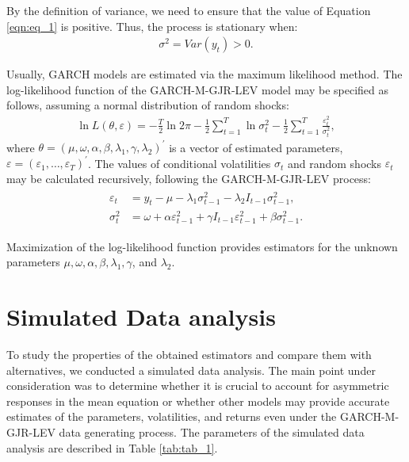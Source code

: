 \documentclass[authoryear, 1p]{elsarticle}
\numberwithin{equation}{section}
\begin{document}
By the definition of variance, we need to ensure that the value of Equation \ref{eqn:eq_1} is positive. Thus, the process is stationary when:
\begin{align}
\sigma^2 = Var(y_{t}) > 0.
\end{align}

Usually, GARCH models are estimated via the maximum likelihood method. The log-likelihood function of the GARCH-M-GJR-LEV model may be specified as follows, assuming a normal distribution of random shocks:
\begin{align}
\ln{L}(\theta, \varepsilon) = -\frac{T}{2} \ln{2\pi} - \frac{1}{2} \sum_{t = 1}^{T} \ln{\sigma^2_{t}} - \frac{1}{2} \sum_{t = 1}^{T} \frac{\varepsilon^2_{t}}{\sigma^2_{t}},
\end{align}
where $\theta = (\mu, \omega, \alpha, \beta, \lambda_{1}, \gamma, \lambda_{2})^{'}$ is a vector of estimated parameters, $\varepsilon = (\varepsilon_{1}, \dots, \varepsilon_{T})^{'}$. The values of conditional volatilities $\sigma_{t}$ and random shocks $\varepsilon_{t}$ may be calculated recursively, following the GARCH-M-GJR-LEV process:
\begin{align}
\begin{split}
\varepsilon_{t} &= y_{t} - \mu - \lambda_{1}\sigma^2_{t-1} - \lambda_{2}I_{t-1}\sigma^2_{t-1}, \\ 
\sigma^2_{t} &= \omega + \alpha \varepsilon^2_{t-1} + \gamma I_{t-1} \varepsilon^2_{t-1} + \beta \sigma^2_{t-1}.
\end{split}
\end{align}

Maximization of the log-likelihood function provides estimators for the unknown parameters $\mu, \omega, \alpha, \beta, \lambda_{1}, \gamma$, and $\lambda_{2}$.

\section{Simulated Data analysis }\label{Section5}


To study the properties of the obtained estimators and compare them with alternatives, we conducted a simulated data analysis. The main point under consideration was to determine whether it is crucial to account for asymmetric responses in the mean equation or whether other models may provide accurate estimates of the parameters, volatilities, and returns even under the GARCH-M-GJR-LEV data generating process. The parameters of the simulated data analysis are described in Table \ref{tab:tab_1}.
\end{document}

